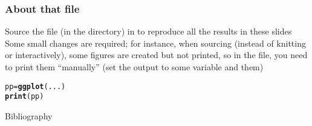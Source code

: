\documentclass[aspectratio=169]{beamer}\usepackage[]{graphicx}\usepackage[]{xcolor}
\makeatletter
\newcommand{\hldef}[1]{\textcolor[rgb]{0.345,0.345,0.345}{#1}}%
\newcommand{\hlkwb}[1]{\textcolor[rgb]{0.69,0.353,0.396}{#1}}%
\newcommand{\hlkwd}[1]{\textcolor[rgb]{0.737,0.353,0.396}{\textbf{#1}}}%
\newenvironment{kframe}{%
 \def\at@end@of@kframe{}%
 \ifinner\ifhmode%
  \def\at@end@of@kframe{\end{minipage}}%
  \begin{minipage}{\columnwidth}%
 \fi\fi%
 \def\FrameCommand##1{\hskip\@totalleftmargin \hskip-\fboxsep
 \colorbox{shadecolor}{##1}\hskip-\fboxsep
     \hskip-\linewidth \hskip-\@totalleftmargin \hskip\columnwidth}%
 \MakeFramed {\advance\hsize-\width
   \@totalleftmargin\z@ \linewidth\hsize
   \@setminipage}}%
 {\par\unskip\endMakeFramed%
 \at@end@of@kframe}
\newenvironment{knitrout}{}{} %
\makeatother
\begin{document}
\begin{frame}[fragile]\frametitle{About that  file}
Source the file  (in the  directory) in  to reproduce all the results in these slides
\vfill
Some small changes are required; for instance, when sourcing (instead of knitting or interactively), some figures are created but not printed, so in the  file, you need to print them ``manually'' (set the output to some variable and  them)
\vfill
\begin{knitrout}
\color{fgcolor}\begin{kframe}
\begin{alltt}
\hldef{pp} \hlkwb{=} \hlkwd{ggplot}\hldef{(...)}
\hlkwd{print}\hldef{(pp)}
\end{alltt}
\end{kframe}
\end{knitrout}
\end{frame}




\begin{frame}[allowframebreaks]{Bibliography}


\end{frame}
\end{document}
